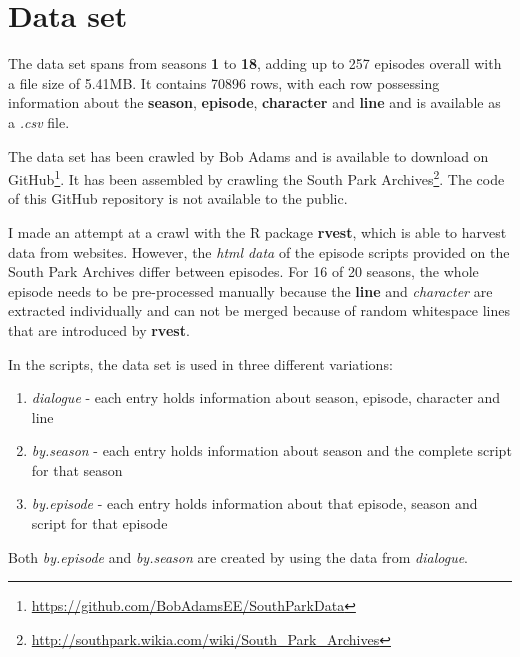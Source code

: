 \documentclass[10pt,a4paper]{article}
\begin{document}
	\section{Data set}	
	The data set spans from seasons \textbf{1} to \textbf{18}, adding up to 257 episodes overall with a file size of 5.41MB. It contains 70896 rows, with each row possessing information about the \textbf{season}, \textbf{episode}, \textbf{character} and \textbf{line} and is available as a \textit{.csv} file.
	
	The data set has been crawled by Bob Adams and is available to download on GitHub\footnote{\url{https://github.com/BobAdamsEE/SouthParkData}}. It has been assembled by crawling the South Park Archives\footnote{\url{http://southpark.wikia.com/wiki/South_Park_Archives}}. The code of this GitHub repository is not available to the public.
	
	 I made an attempt at a crawl with the R package \textbf{rvest}, which is able to harvest data from websites.  However, the \textit{html data} of the episode scripts provided on the South Park Archives differ between episodes. For 16 of 20 seasons, the whole episode needs to be pre-processed manually because the \textbf{line} and \textit{character} are extracted individually and can not be merged because of random whitespace lines that are introduced by \textbf{rvest}.
	 
	 In the scripts, the data set is used in three different variations:
	 \begin{enumerate}
	 \item \textit{dialogue} - each entry holds information about season, episode, character and line
	 \item \textit{by.season} - each entry holds information about season and the complete script for that season
	 \item \textit{by.episode} - each entry holds information about that episode, season and script for that episode
	 \end{enumerate}
	 
	 Both \textit{by.episode} and \textit{by.season} are created by using the data from \textit{dialogue}.
	
	
	
\end{document}
